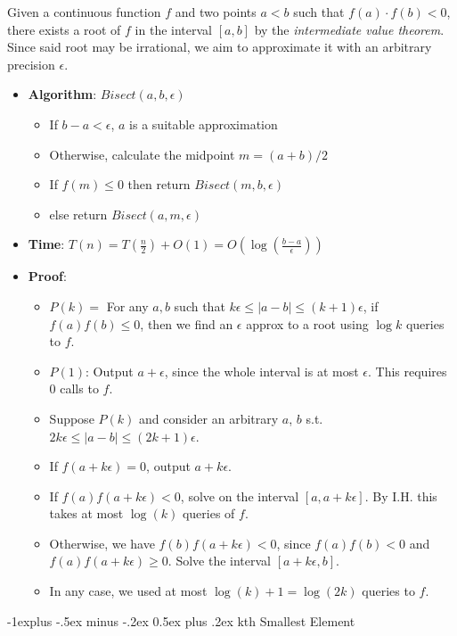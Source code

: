 \documentclass[10pt,landscape,a4paper]{article}
\makeatletter
\renewcommand{\subsection}{\@startsection{subsection}{2}{0mm}%
                                {-1explus -.5ex minus -.2ex}%
                                {0.5ex plus .2ex}%
                                {\normalfont\normalsize\bfseries}}
\makeatother
\begin{document}
\begin{multicols*}{3}
Given a continuous function $f$ and two points $a < b$ such that $f(a) \cdot f(b) < 0$, there exists a root of $f$ in the interval $[a, b]$ by the \textit{intermediate value theorem}. Since said root may be irrational, we aim to approximate it with an arbitrary precision $\epsilon$.

\begin{itemize}
    \item \textbf{Algorithm}: $Bisect(a, b, \epsilon)$
    \begin{itemize}
        \item If $b - a < \epsilon$, $a$ is a suitable approximation
        \item Otherwise, calculate the midpoint $m = (a + b)/2$
        \item If $f(m) \le 0$ then return $Bisect(m, b, \epsilon)$
        \item else return $Bisect(a, m, \epsilon)$
    \end{itemize}
    \item \textbf{Time}: $T(n) = T(\frac{n}{2}) + O(1) = O(\log(\frac{b - a}{\epsilon}))$
    \item \textbf{Proof}:
    \begin{itemize}
        \item $P(k) =$ For any $a, b$ such that $k\epsilon \le |a - b| \le (k + 1)\epsilon$, if $f(a)f(b) \le 0$, then we find an $\epsilon$ approx to a root using $\log k$ queries to $f$.
        \item $P(1)$: Output $a + \epsilon$, since the whole interval is at most $\epsilon$. This requires $0$ calls to $f$.
        \item Suppose $P(k)$ and consider an arbitrary $a$, $b$ s.t. $2k\epsilon \le |a - b| \le (2k + 1)\epsilon$.
        \item If $f(a + k\epsilon) = 0$, output $a + k\epsilon$.
        \item If $f(a)f(a + k\epsilon) < 0$, solve on the interval $[a, a + k\epsilon]$. By I.H. this takes at most $\log(k)$ queries of $f$.
        \item Otherwise, we have $f(b)f(a + k\epsilon) < 0$, since $f(a)f(b) < 0$ and $f(a)f(a + k\epsilon) \ge 0$. Solve the interval $[a + k\epsilon, b]$.
        \item In any case, we used at most $\log(k) + 1 = \log(2k)$ queries to $f$.
    \end{itemize}
\end{itemize}

\subsection{kth Smallest Element}


\end{multicols*}
\end{document}
